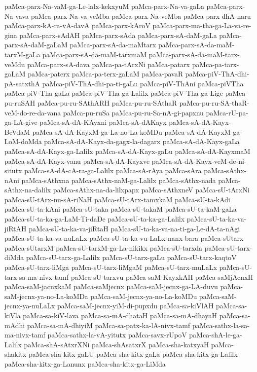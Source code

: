 {paMca-parx-Na-vaM-ga-Le-lalx-kekxyuM
paMca-parx-Na-va-gaLa
paMca-parx-Na-vava
paMca-parx-Na-va-veMba
paMca-parx-Na-veMba
paMca-parx-dhA-naru
paMca-parx-kA-ra-vA-davA
paMca-parx-kAroV
paMca-parx-ma-tha-ga-La-va-re-gina
paMca-parx-sAdAH
paMca-parx-sAda
paMca-parx-sA-daM-gaLa
paMca-parx-sA-daM-gaLaM
paMca-parx-sA-da-maMtarx
paMca-parx-sA-da-maM-tarxM-gaLa
paMca-parx-sA-da-maM-tarxmaM
paMca-parx-sA-da-maM-tarx-veMdu
paMca-parx-sA-dava
paMca-pa-tArxNi
paMca-patarx
paMca-pa-tarx-gaLaM
paMca-paterx
paMca-pa-terx-gaLaM
paMca-pavaR
paMca-piV-ThA-dhi-pA-satxthA
paMca-piV-ThA-dhi-pa-ti-gaLu
paMca-piV-ThAni
paMca-piVTha
paMca-piV-Tha-gaLa
paMca-piV-Tha-ga-Lalilx
paMca-piV-Tha-ga-Lige
paMca-pu-ruSAH
paMca-pu-ru-SAthARH
paMca-pu-ru-SAthaR
paMca-pu-ru-SA-thaR-veM-do-re-da-vana
paMca-pu-ruSa
paMca-pu-ru-Sa-nA-gi-papxnu
paMca-rU-pa-ga-LA-give
paMca-sA-dA-KAyxni
paMca-sA-dAKayx
paMca-sA-dA-Kayx-BeVdaM
paMca-sA-dA-KayxM-ga-La-no-La-koMDu
paMca-sA-dA-KayxM-ga-LoM-doMda
paMca-sA-dA-Kayx-da-gagx-la-dagarx
paMca-sA-dA-Kayx-gaLa
paMca-sA-dA-Kayx-ga-Lalilx
paMca-sA-dA-Kayx-gaLu
paMca-sA-dA-KayxmaM
paMca-sA-dA-Kayx-vanu
paMca-sA-dA-Kayxve
paMca-sA-dA-Kayx-veM-de-ni-situtx
paMca-sA-dA-cA-ra-ga-Lalilx
paMca-sA-rAya
paMca-sAra
paMca-sAthx-nAni
paMca-sAthxna
paMca-sAthx-naM-ga-Lalilx
paMca-sAthx-nada
paMca-sAthx-na-dalilx
paMca-sAthx-na-da-lilxpapx
paMca-sAthxneV
paMca-sU-tArxNi
paMca-sU-tArx-nu-sA-riNaH
paMca-sU-tArx-tamxkaM
paMca-sU-ta-kAdi
paMca-sU-ta-kAni
paMca-sU-taka
paMca-sU-takaM
paMca-sU-ta-kaM-gaLa
paMca-sU-ta-ka-ga-LaM-Ti-daDe
paMca-sU-ta-ka-ga-Lalilx
paMca-sU-ta-ka-va-jiRtAH
paMca-sU-ta-ka-va-jiRtaH
paMca-sU-ta-ka-va-na-ti-ga-Le-dA-ta-nAgi
paMca-sU-ta-ka-va-nuLaLx
paMca-sU-ta-ka-vu-LaLx-nanx-bara
paMca-sUtarx
paMca-sUtarxM
paMca-sU-tarxM-ga-La-nikikx
paMca-sU-tarxda
paMca-sU-tarx-diMda
paMca-sU-tarx-ga-Lalilx
paMca-sU-tarx-gaLu
paMca-sU-tarx-kaqtoV
paMca-sU-tarx-liMga
paMca-sU-tarx-liMgaM
paMca-sU-tarx-muLaLx
paMca-sU-tarx-sa-ma-nivx-tamf
paMca-sU-tarxvu
paMca-saM-KayxkAH
paMca-saMjAcnxH
paMca-saM-jacnxkaM
paMca-saMjecnx
paMca-saM-jecnx-ga-LA-duvu
paMca-saM-jecnx-ya-no-La-koMDa
paMca-saM-jecnx-ya-no-La-koMDu
paMca-saM-jecnx-ya-nuLaLx
paMca-saM-jecnx-yiM-di-pupxdu
paMca-sa-kiVlAH
paMca-sa-kiVla
paMca-sa-kiV-lava
paMca-sa-mA-dhataH
paMca-sa-mA-dhayaH
paMca-sa-mAdhi
paMca-sa-mA-dhiyiM
paMca-sa-patx-ka-lA-nivx-tamf
paMca-sathx-la-sa-ma-nivx-tamf
paMca-sathx-la-vA-yitutx
paMca-savx-rUpoV
paMca-shA-le-ga-Lalilx
paMca-shA-sAtxrXNi
paMca-shAsatxrX
paMca-sha-katxyaH
paMca-shakitx
paMca-sha-kitx-gaLU
paMca-sha-kitx-gaLa
paMca-sha-kitx-ga-Lalilx
paMca-sha-kitx-ga-Lanunx
paMca-sha-kitx-ga-LiMda
}
